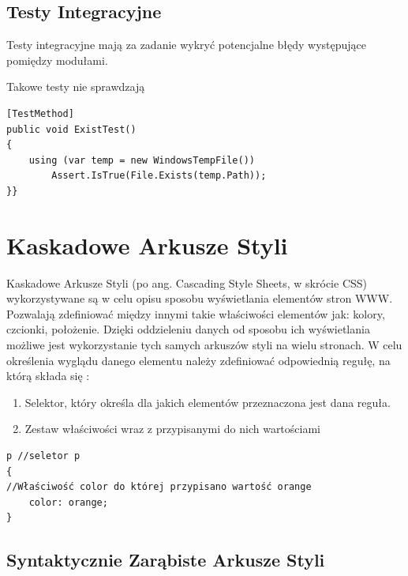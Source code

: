 \section{Testy Integracyjne}

Testy integracyjne mają za zadanie wykryć potencjalne błędy występujące pomiędzy modułami. 

Takowe testy nie sprawdzają

\begin{lstlisting}[frame=single, numbers=none,captionpos=b, 
caption={Test integracyjny wykorzystany w projekcie.}]
[TestMethod]
public void ExistTest()
{
	using (var temp = new WindowsTempFile())
		Assert.IsTrue(File.Exists(temp.Path));
}}
\end{lstlisting}

\newpage
{\let\cleardoublepage\relax \chapter{Kaskadowe Arkusze Styli}}

Kaskadowe Arkusze Styli (po ang. Cascading Style Sheets, w skrócie CSS)\cite{CSSDoc} wykorzystywane są w celu opisu sposobu wyświetlania elementów stron WWW. Pozwalają zdefiniować między innymi takie właściwości elementów jak: kolory, czcionki, położenie. Dzięki oddzieleniu danych od sposobu ich wyświetlania możliwe jest wykorzystanie tych samych arkuszów styli na wielu stronach. 
W celu określenia wyglądu danego elementu należy zdefiniować odpowiednią regułę, na którą składa się :
\begin{enumerate}
	\item Selektor, który określa dla jakich elementów przeznaczona jest dana reguła.
	\item Zestaw właściwości wraz z przypisanymi do nich wartościami
\end{enumerate}

\begin{lstlisting}[frame=single, numbers=none,captionpos=b, 
caption={Przykład prostego selektora, który sprawi, iż wszystkie paragrafy będą miały domyślnie kolor pomarańczowy.}]
p //seletor p
{
//Właściwość color do której przypisano wartość orange
    color: orange;
}
\end{lstlisting}

\section{Syntaktycznie Zarąbiste Arkusze Styli}

